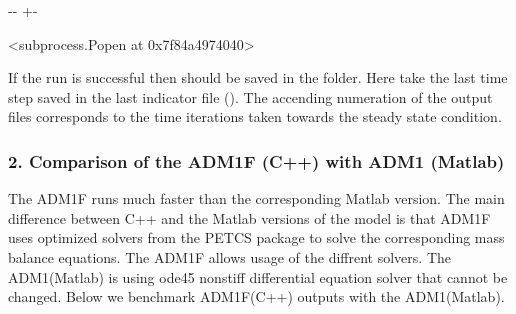 \documentclass[a4paper,10pt,english]{sphinxmanual}
\newlength\nbsphinxcodecellspacing
\begin{document}
{
\begin{sphinxVerbatim}[commandchars=\\\{\}]
\llap{\color{nbsphinxin}[6]:\,\hspace{\fboxrule}\hspace{\fboxsep}}
 
\end{sphinxVerbatim}
}

{

\kern-\sphinxverbatimsmallskipamount\kern-\baselineskip
\kern+\FrameHeightAdjust\kern-\fboxrule
\vspace{\nbsphinxcodecellspacing}

\begin{sphinxVerbatim}[commandchars=\\\{\}]
\llap{\color{nbsphinxout}[6]:\,\hspace{\fboxrule}\hspace{\fboxsep}}<subprocess.Popen at 0x7f84a4974040>
\end{sphinxVerbatim}
}

\sphinxAtStartPar
If the run is successful then  should be saved in the  folder. Here take the last time step saved in the last indicator file (). The accending numeration of the output files corresponds to the time iterations taken towards the steady state condition.


\subsubsection{2. Comparison of the ADM1F (C++) with ADM1 (Matlab)}
\label{\detokenize{jupyter_notebook/Steady_State_Run:2.-Comparison-of-the-ADM1F-(C++)-with-ADM1-(Matlab)}}
\sphinxAtStartPar
The ADM1F runs much faster than the corresponding Matlab version. The main difference between C++ and the Matlab versions of the model is that ADM1F uses optimized solvers from the PETCS package to solve the corresponding mass balance equations. The ADM1F allows usage of the diffrent solvers. The ADM1(Matlab) is using ode45 nonstiff differential equation solver that cannot be changed. Below we benchmark ADM1F(C++) outputs with the ADM1(Matlab).
\end{document}
